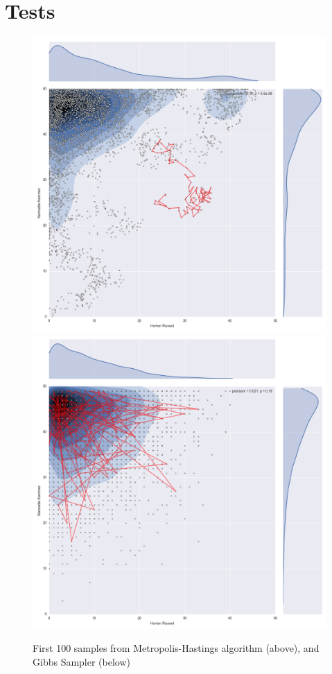\documentclass[12pt]{article}
\begin{document}




\clearpage
\section{Tests}
\begin{figure}[!ht]
	\centering
	\includegraphics[width=0.7\columnwidth]{out/T8_23/MH/plot/joint_scatter_plot} \\
	\includegraphics[width=0.7\columnwidth]{out/T8_23/Gibbs/plot/joint_scatter_plot} \\
	\caption{First 100 samples from Metropolis-Hastings algorithm (above), and Gibbs Sampler (below)}
	\label{dmaçsd}
\end{figure}
\end{document}

